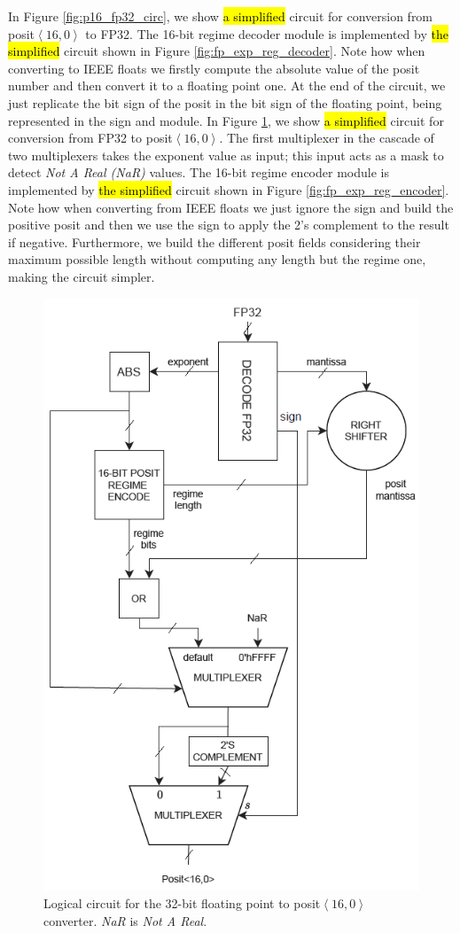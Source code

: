 In Figure \ref{fig:p16_fp32_circ}, we show \hl{a simplified} circuit for conversion from posit$\left<16,0\right>$ to FP32. The 16-bit regime decoder module is implemented by \hl{the simplified} circuit shown in Figure \ref{fig:fp_exp_reg_decoder}. Note how when converting to IEEE floats we firstly compute the absolute value of the posit number and then convert it to a floating point one. At the end of the circuit, we just replicate the bit sign of the posit in the bit sign of the floating point, being represented in the sign and module. 
In Figure \ref{fig:fp32_p16_circ}, we show \hl{a simplified} circuit for conversion from FP32 to posit$\left<16,0\right>$. The first multiplexer in the cascade of two multiplexers takes the exponent value as input; this input acts as a mask to detect \textit{Not A Real (NaR)} values. The 16-bit regime encoder module is implemented by \hl{the simplified} circuit shown in Figure \ref{fig:fp_exp_reg_encoder}. Note how when converting from IEEE floats we just ignore the sign and build the positive posit and then we use the sign to apply the 2's complement to the result if negative. Furthermore, we build the different posit fields considering their maximum possible length without computing any length but the regime one, making the circuit simpler.

\begin{figure}
    \centering
    \includegraphics[width=0.5\linewidth]{img/fp32_p16.PNG}
    \caption{Logical circuit for the 32-bit floating point to posit$\left<16,0\right>$ converter. \textit{NaR} is \textit{Not A Real}.}
    \label{fig:fp32_p16_circ}
\end{figure}


